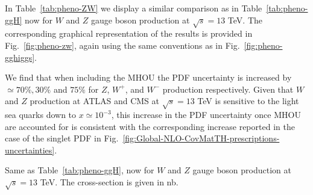 In Table~\ref{tab:pheno-ZW} we display a similar
comparison as in Table~\ref{tab:pheno-ggH} now for
        $W$ and $Z$ gauge boson production at $\sqrt{s}=13$ TeV.
%
The corresponding graphical representation of the results is provided in
Fig.~\ref{fig:pheno-zw}, again using the same conventions as in
Fig.~\ref{fig:pheno-gghiggs}.

We find that when including the
 MHOU the PDF uncertainty
is increased by
$\simeq 70\%, 30\%$ and $75\%$ for $Z$, $W^+$, and $W^-$ production
 respectively. 
Given that $W$ and $Z$ production at ATLAS and CMS at $\sqrt{s}=13$ TeV
is sensitive to the light sea quarks down to $x\simeq 10^{-3}$, this increase
in the PDF uncertainty once MHOU are accounted for is consistent
with the corresponding increase reported in the case
of the singlet PDF in Fig.~\ref{fig:Global-NLO-CovMatTH-prescriptions-uncertainties}.

\begin{table}[t]
  \centering
  \small
  
  \vspace{2mm}
  \caption{Same as Table~\ref{tab:pheno-ggH}, now for
        $W$ and $Z$ gauge boson production at $\sqrt{s}=13$ TeV. The cross-section 
         is given in nb.}
  \label{tab:pheno-ZW}
\end{table}

